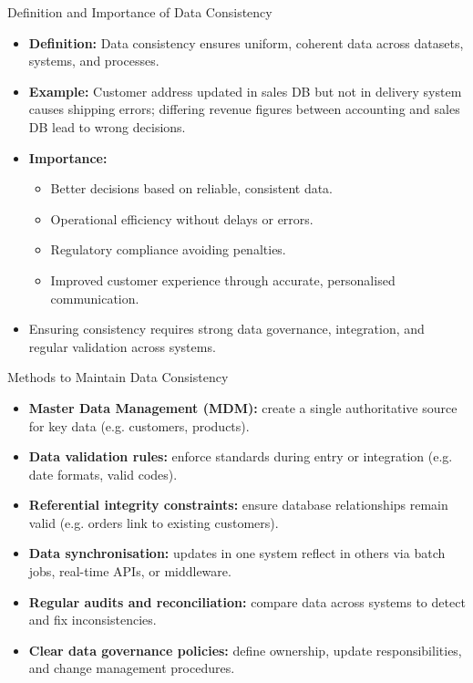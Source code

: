 \documentclass[aspectratio=169, table]{beamer}
\begin{document}
\begin{frame}{Definition and Importance of Data Consistency}
	\vspace{20pt}
	
	\begin{itemize}
		\item \textbf{Definition:} Data consistency ensures uniform, coherent data across datasets, systems, and processes.
		
		\item \textbf{Example:} Customer address updated in sales DB but not in delivery system causes shipping errors; differing revenue figures between accounting and sales DB lead to wrong decisions.
		
		\item \textbf{Importance:}
		\begin{itemize}
			\item Better decisions based on reliable, consistent data.
			\item Operational efficiency without delays or errors.
			\item Regulatory compliance avoiding penalties.
			\item Improved customer experience through accurate, personalised communication.
		\end{itemize}
		
		\item Ensuring consistency requires strong data governance, integration, and regular validation across systems.
	\end{itemize}
	
\end{frame}

\begin{frame}{Methods to Maintain Data Consistency}
	\vspace{20pt}
	
	\begin{itemize}
		\item \textbf{Master Data Management (MDM):} create a single authoritative source for key data (e.g. customers, products).
		
		\item \textbf{Data validation rules:} enforce standards during entry or integration (e.g. date formats, valid codes).
		
		\item \textbf{Referential integrity constraints:} ensure database relationships remain valid (e.g. orders link to existing customers).
		
		\item \textbf{Data synchronisation:} updates in one system reflect in others via batch jobs, real-time APIs, or middleware.
		
		\item \textbf{Regular audits and reconciliation:} compare data across systems to detect and fix inconsistencies.
		
		\item \textbf{Clear data governance policies:} define ownership, update responsibilities, and change management procedures.
	\end{itemize}
	
\end{frame}
\end{document}
